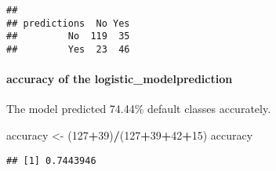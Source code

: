 \documentclass[]{article}
\newenvironment{Shaded}{\begin{snugshade}}{\end{snugshade}}
\newcommand{\CommentTok}[1]{\textcolor[rgb]{0.56,0.35,0.01}{\textit{#1}}}
\newcommand{\DataTypeTok}[1]{\textcolor[rgb]{0.13,0.29,0.53}{#1}}
\newcommand{\DecValTok}[1]{\textcolor[rgb]{0.00,0.00,0.81}{#1}}
\newcommand{\FloatTok}[1]{\textcolor[rgb]{0.00,0.00,0.81}{#1}}
\newcommand{\KeywordTok}[1]{\textcolor[rgb]{0.13,0.29,0.53}{\textbf{#1}}}
\newcommand{\NormalTok}[1]{#1}
\newcommand{\OperatorTok}[1]{\textcolor[rgb]{0.81,0.36,0.00}{\textbf{#1}}}
\newcommand{\StringTok}[1]{\textcolor[rgb]{0.31,0.60,0.02}{#1}}
\let\oldparagraph\paragraph
\renewcommand{\paragraph}[1]{\oldparagraph{#1}\mbox{}}
\begin{document}
\begin{Shaded}
\end{Shaded}

\begin{verbatim}
##            
## predictions  No Yes
##         No  119  35
##         Yes  23  46
\end{verbatim}

\hypertarget{accuracy-of-the-logistic_modelprediction}{%
\paragraph{accuracy of the
logistic\_modelprediction}\label{accuracy-of-the-logistic_modelprediction}}

The model predicted 74.44\% default classes accurately.

\begin{Shaded}
\begin{Highlighting}[]
\NormalTok{accuracy <-}\StringTok{ }\NormalTok{(}\DecValTok{127}\OperatorTok{+}\DecValTok{39}\NormalTok{)}\OperatorTok{/}\NormalTok{(}\DecValTok{127}\OperatorTok{+}\DecValTok{39}\OperatorTok{+}\DecValTok{42}\OperatorTok{+}\DecValTok{15}\NormalTok{)}
\NormalTok{accuracy}
\end{Highlighting}
\end{Shaded}

\begin{verbatim}
## [1] 0.7443946
\end{verbatim}
\end{document}
